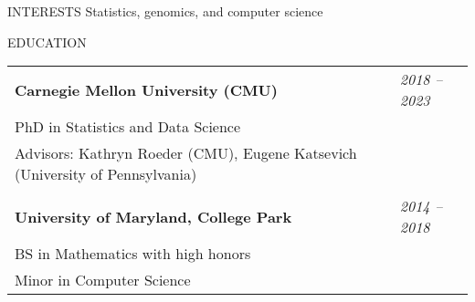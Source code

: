 \documentclass{resume} %
\begin{document}

\begin{rSection}{INTERESTS}
Statistics, genomics, and computer science
\end{rSection}

\begin{rSection}{EDUCATION}

\begin{tabular}{p{14cm}R{2.5cm}}
	\bf{Carnegie Mellon University (CMU)}  &  \it{2018 -- 2023}  \\ 
	PhD in Statistics and Data Science &  \\ Advisors: Kathryn Roeder (CMU), Eugene Katsevich (University of Pennsylvania) & \\ &\\
	\textbf{University of Maryland, College Park} & \it{2014 -- 2018}
	 \\  BS in Mathematics with high honors & \\
	 Minor in Computer Science
\end{tabular} 

\end{rSection}





\end{document}
